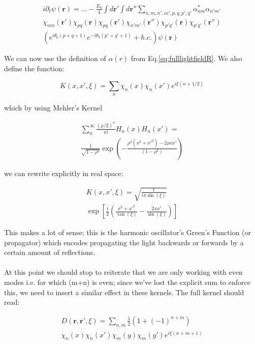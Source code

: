 \documentclass[a4paper,twocolumn,nobalancelastpage]{revtex4-1}
\newcommand{\vect}[1]{\mathbf{#1}}
\begin{document}
\begin{multline}
\label{eq:eqnpsi}
i\partial_t \psi(\textbf{r})= ... - \frac{E_0}{4} \int d\textbf{r}' \int d\textbf{r}''
\sum_{n,m,n',m',p,q,p',q'} \alpha_{nm}^* \alpha_{n'm'} \\
 \chi_{nm} (\textbf{r}') \chi_{pq} (\textbf{r}) \chi_{pq} (\textbf{r}') \chi_{n'm'} (\textbf{r}'') \chi_{p'q'} (\textbf{r}) \chi_{p'q'} (\textbf{r}'') \\
  \left(e^{i\theta_0(p+q+1)}e^{-i\theta_0(p'+q'+1)}+h.c. \right)
\psi(\vect{r})
\end{multline}

We can now use the definition of $\alpha(r)$ from Eq.\ref{eq:fulllightfieldR}.
We also define the function:

\begin{equation}
\label{eq:kernInChis}
K(x,x',\xi)=\sum_{n} \chi_n (x) \chi_n (x') e^{i\xi(n+1/2)}
\end{equation}

which by using Mehler's Kernel

\begin{multline}
\sum_{n}^{\infty} \frac{(\rho/2)^n}{n!} H_n(x) H_n(x') = \\
\frac{1}{\sqrt{1-\rho^2}}
\exp{\left(-
\frac{\rho^2(x^2+x'^2)-2\rho x x'}{(1-\rho^2)}\right)
}
\end{multline}

we can rewrite explicitly in real space:

\begin{multline}
\label{eq:integralkernelK}
K(x,x',\xi)=\sqrt{\frac{1}{i \pi \sin(\xi)}} \\ \exp{\left[ 
\frac{i }{2 } \left(
\frac{x^2+x'^2}{\tan(\xi)}-\frac{2 x x'}{\sin(\xi)}
\right) \right] }
\end{multline}

This makes a lot of sense: this is the harmonic oscillator's Green's Function (or propagator) which encodes propagating the light backwards or forwards by a certain amount of reflections.\\
\\
At this point we should stop to reiterate that we are only working with even modes i.e. for which (m+n) is even; since we've lost the explicit sum to enforce this, we need to insert a similar effect in these kernels.
The full kernel should read:

\begin{multline}
D(\textbf{r},\textbf{r}',\xi)= \sum_{n,m} \frac{1}{2} (1+(-1)^{n+m}) \\ \chi_n (x) \chi_n (x') \chi_m (y) \chi_m (y') e^{i\xi(n+m+1)}
\end{multline}
\end{document}
